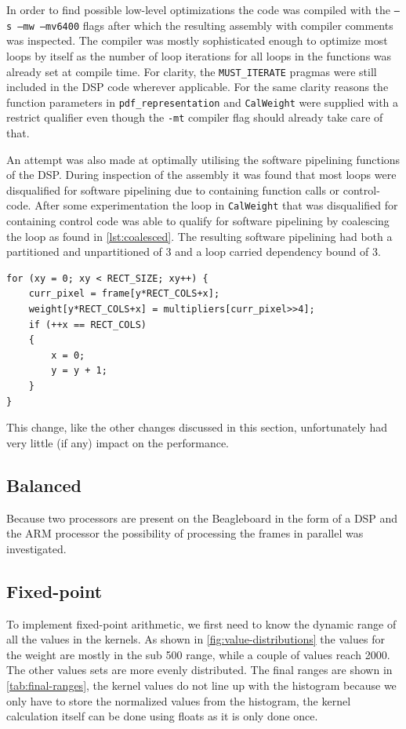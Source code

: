 \documentclass[final]{article}
\begin{document}
In order to find possible low-level optimizations the code was compiled with the \texttt{–s –mw –mv6400} flags after which the resulting assembly with compiler comments was inspected. The compiler was mostly sophisticated enough to optimize most loops by itself as the number of loop iterations for all loops in the functions was already set at compile time. For clarity, the \texttt{MUST\_ITERATE} pragmas were still included in the DSP code wherever applicable. For the same clarity reasons the function parameters in \texttt{pdf\_representation} and \texttt{CalWeight} were supplied with a restrict qualifier even though the \texttt{-mt} compiler flag should already take care of that.

An attempt was also made at optimally utilising the software pipelining functions of the DSP. During inspection of the assembly it was found that most loops were disqualified for software pipelining due to containing function calls or control-code. After some experimentation the loop in \texttt{CalWeight} that was disqualified for containing control code was able to qualify for software pipelining by coalescing the loop as found in \cref{lst:coalesced}. The resulting software pipelining had both a partitioned and unpartitioned of 3 and a loop carried dependency bound of 3.

\begin{lstlisting}[style=c, caption=Coalesced loop for weight calculation, label=lst:coalesced]
for (xy = 0; xy < RECT_SIZE; xy++) {
    curr_pixel = frame[y*RECT_COLS+x];
    weight[y*RECT_COLS+x] = multipliers[curr_pixel>>4];
    if (++x == RECT_COLS)
    {
        x = 0;
        y = y + 1;
    }
}
\end{lstlisting}

This change, like the other changes discussed in this section, unfortunately had very little (if any) impact on the performance.

\subsection{Balanced}
Because two processors are present on the Beagleboard in the form of a DSP and the ARM processor the possibility of processing the frames in parallel was investigated.

\subsection{Fixed-point}
To implement fixed-point arithmetic, we first need to know the dynamic range of all the values in the kernels.
As shown in \cref{fig:value-distributions} the values for the weight are mostly in the sub \num{500} range, while a couple of values reach \num{2000}.
The other values sets are more evenly distributed.
The final ranges are shown in \cref{tab:final-ranges}, the kernel values do not line up with the histogram because we only have to store the normalized values from the histogram, the kernel calculation itself can be done using floats as it is only done once.
\end{document}

